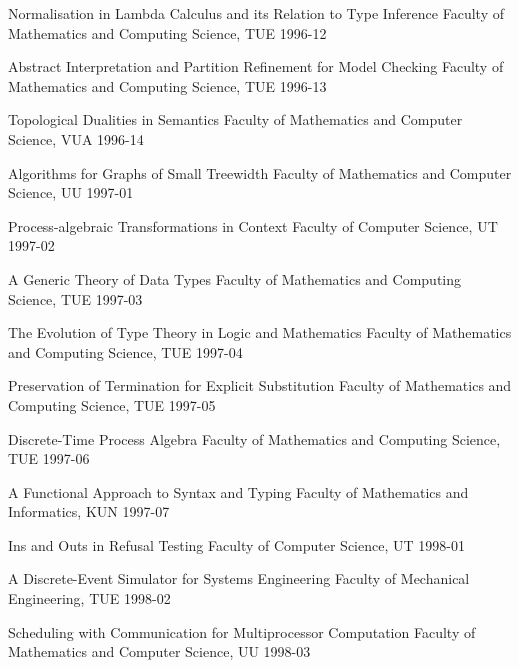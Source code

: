 \begin{multicols}{2}
         {Normalisation in Lambda Calculus and its Relation to Type 
Inference}
         {Faculty of Mathematics and Computing Science, TUE}
         {1996-12}

         {Abstract Interpretation and Partition Refinement for Model 
Checking}
         {Faculty of Mathematics and Computing Science, TUE}
         {1996-13}

         {Topological Dualities in Semantics}
         {Faculty of Mathematics and Computer Science, VUA}
         {1996-14}

         {Algorithms for Graphs of Small Treewidth}
         {Faculty of Mathematics and Computer Science, UU}
         {1997-01}

         {Process-algebraic Transformations in Context}
         {Faculty of Computer Science, UT}
         {1997-02}

         {A Generic Theory of Data Types}
         {Faculty of Mathematics and Computing Science, TUE}
         {1997-03}

         {The Evolution of Type Theory in Logic and Mathematics}
         {Faculty of Mathematics and Computing Science, TUE}
         {1997-04}

         {Preservation of Termination for Explicit Substitution}
         {Faculty of Mathematics and Computing Science, TUE}
         {1997-05}

         {Discrete-Time Process Algebra}
         {Faculty of Mathematics and Computing Science, TUE}
         {1997-06}

         {A Functional Approach to Syntax and Typing}
         {Faculty of Mathematics and Informatics, KUN}
         {1997-07}

         {Ins and Outs in Refusal Testing}
         {Faculty of Computer Science, UT}
         {1998-01}

         {A Discrete-Event Simulator for Systems Engineering}
         {Faculty of Mechanical Engineering, TUE}
         {1998-02}      

         {Scheduling with Communication for Multiprocessor 
Computation}
         {Faculty of Mathematics and Computer Science, UU}
         {1998-03}      


\end{multicols}
